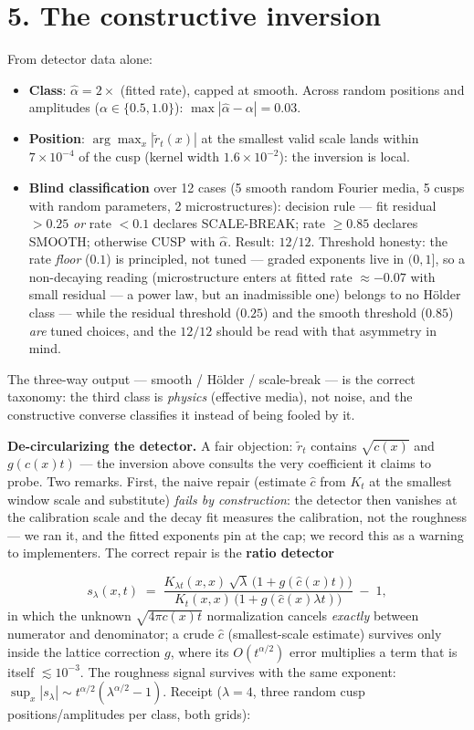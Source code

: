 \documentclass[11pt]{article}
\begin{document}
\section*{5. The constructive inversion}
From detector data alone:

\begin{itemize}
\item \textbf{Class}: $\hat\alpha = 2\times$ (fitted rate), capped at smooth. Across random positions and amplitudes ($\alpha \in \{0.5, 1.0\}$): $\max|\hat\alpha - \alpha| = 0.03$.
\item \textbf{Position}: $\arg\max_x |\tilde r_t(x)|$ at the smallest valid scale lands within $7\times 10^{-4}$ of the cusp (kernel width $1.6\times 10^{-2}$): the inversion is local.
\item \textbf{Blind classification} over 12 cases (5 smooth random Fourier media, 5 cusps with random parameters, 2 microstructures): decision rule — fit residual $> 0.25$ \emph{or} rate $< 0.1$ declares SCALE-BREAK; rate $\ge 0.85$ declares SMOOTH; otherwise CUSP with $\hat\alpha$.  Result: $12/12$.  Threshold honesty: the rate \emph{floor} ($0.1$) is principled, not tuned — graded exponents live in $(0,1]$, so a non-decaying reading (microstructure enters at fitted rate $\approx -0.07$ with small residual — a power law, but an inadmissible one) belongs to no Hölder class — while the residual threshold ($0.25$) and the smooth threshold ($0.85$) \emph{are} tuned choices, and the $12/12$ should be read with that asymmetry in mind.
\end{itemize}
The three-way output — smooth / Hölder / scale-break — is the correct taxonomy: the third class is \emph{physics} (effective media), not noise, and the constructive converse classifies it instead of being fooled by it.

\textbf{De-circularizing the detector.}  A fair objection: $\tilde r_t$ contains $\sqrt{c(x)}$ and $g(c(x)t)$ — the inversion above consults the very coefficient it claims to probe.  Two remarks.  First, the naive repair (estimate $\hat c$ from $K_t$ at the smallest window scale and substitute) \emph{fails by construction}: the detector then vanishes at the calibration scale and the decay fit measures the calibration, not the roughness — we ran it, and the fitted exponents pin at the cap; we record this as a warning to implementers.  The correct repair is the \textbf{ratio detector}

\[
s_\lambda(x,t) \;=\;
\frac{K_{\lambda t}(x,x)\,\sqrt\lambda\,\bigl(1+g(\hat c(x)t)\bigr)}
     {K_t(x,x)\,\bigl(1+g(\hat c(x)\lambda t)\bigr)} \;-\; 1,
\]
in which the unknown $\sqrt{4\pi c(x)t}$ normalization cancels \emph{exactly} between numerator and denominator; a crude $\hat c$ (smallest-scale estimate) survives only inside the lattice correction $g$, where its $O(t^{\alpha/2})$ error multiplies a term that is itself $\lesssim 10^{-3}$.  The roughness signal survives with the same exponent: $\sup_x|s_\lambda| \sim t^{\alpha/2}(\lambda^{\alpha/2}-1)$.  Receipt ($\lambda = 4$, three random cusp positions/amplitudes per class, both grids):
\end{document}
